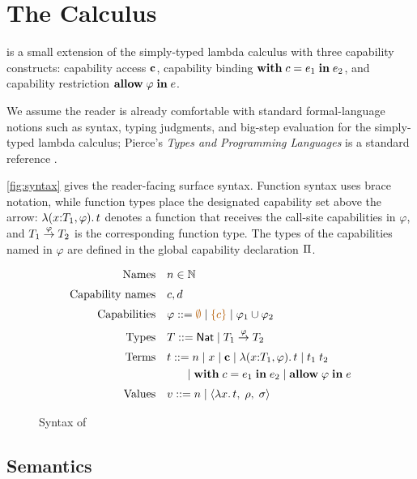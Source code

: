 
\section{The \lambdaCap{} Calculus}
\label{sec:calculus}

\lambdaCap{} is a small extension of the simply-typed lambda calculus with three
capability constructs: %
capability access $\mathbf{c}$, %
capability binding $\mathbf{with}\;c = e_1\;\mathbf{in}\;e_2$, %
and capability restriction $\mathbf{allow}\;\varphi\;\mathbf{in}\;e$. %

We assume the reader is already comfortable with standard formal-language
notions such as syntax, typing judgments, and big-step evaluation for the
simply-typed lambda calculus; Pierce's \emph{Types and Programming Languages} is
a standard reference \cite{pierce-tapl}. %

\autoref{fig:syntax} gives the reader-facing surface syntax. %
Function syntax uses brace notation, while function types place the designated
capability set above the arrow: $\lambda (x{:}T_1, \varphi).\,t$ denotes a
function that receives the call-site capabilities in $\varphi$, and
$T_1 \overset{\varphi}{\rightarrow} T_2$ is the corresponding function type. %
The types of the capabilities named in $\varphi$ are defined in the global
capability declaration $\Pi$. %

\begin{figure}[t]
\centering
\begin{align*}
\text{Names} \quad & n \in \mathbb{N} \\[0.25em]
\text{Capability names} \quad & c, d \\[0.25em]
\text{Capabilities} \quad & \varphi ::= \effempty \mid \eff{c} \mid \varphi_1 \effunion \varphi_2 \\[0.25em]
\text{Types} \quad & T ::= \tnat \mid \tarr{T_1}{T_2}{\varphi}{\varphi} \\[0.25em]
\text{Terms} \quad & t ::= \tmconst{n} \mid x \mid \tmcvar{c} \mid
    \tmabs{x}{T_1}{\varphi}{\varphi}{t} \mid \tmapp{t_1}{t_2} \\
    & \quad\;\;\mid \tmwith{c}{e_1}{e_2} \mid \tmallow{\varphi}{e}
    \\[0.25em]
\text{Values} \quad & v ::= \vlconst{n} \mid
    \vlclosshort{x}{t}{\vlenv}{\cpenv}
\end{align*}
\caption{Syntax of \lambdaCap{}}
\label{fig:syntax}
\end{figure}

\subsection{Semantics}
\label{sec:semantics}


